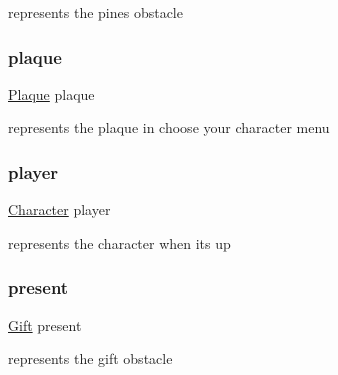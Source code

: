 represents the pines obstacle 

\mbox{\label{group___graphics_ga34de8a6bdc6062347016b82e556b42a7}} 
\subsubsection{\texorpdfstring{plaque}{plaque}}
{\footnotesize\ttfamily \hyperlink{struct_plaque}{Plaque} plaque\hspace{0.3cm}{\ttfamily [static]}}



represents the plaque in choose your character menu 

\mbox{\label{group___graphics_ga6be64c98dff07b5401940d55c9f75d83}} 
\subsubsection{\texorpdfstring{player}{player}}
{\footnotesize\ttfamily \hyperlink{struct_character}{Character} player\hspace{0.3cm}{\ttfamily [static]}}



represents the character when it\textquotesingle{}s up 

\mbox{\label{group___graphics_ga6f8fa1a6c397b5d7b17fc82133bfa3d4}} 
\subsubsection{\texorpdfstring{present}{present}}
{\footnotesize\ttfamily \hyperlink{struct_gift}{Gift} present\hspace{0.3cm}{\ttfamily [static]}}



represents the gift obstacle 

